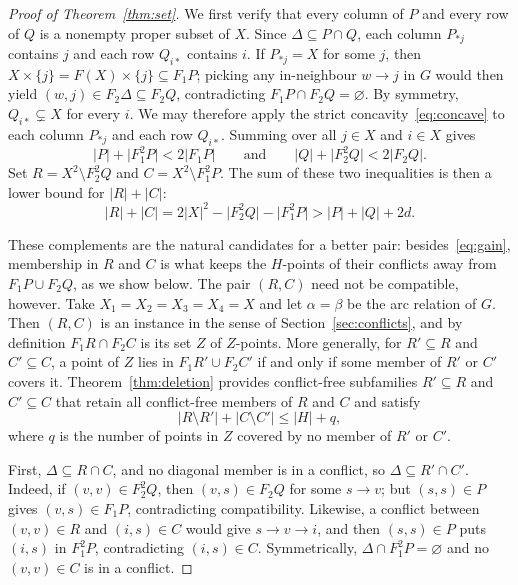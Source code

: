 \documentclass[11pt]{amsart}
\theoremstyle{remark}
\newcommand{\abs}[1]{\lvert #1\rvert}
\begin{document}
\begin{proof}[Proof of Theorem~\ref{thm:set}]
We first verify that every column of $P$ and every row of $Q$ is a nonempty proper subset of $X$. Since $\Delta\subseteq P\cap Q$, each column $P_{\ast j}$ contains $j$ and each row $Q_{i\ast}$ contains $i$. If $P_{\ast j}=X$ for some $j$, then $X\times\{j\}=F(X)\times\{j\}\subseteq F_1P$; picking any in-neighbour $w\to j$ in $G$ would then yield $(w,j)\in F_2\Delta\subseteq F_2Q$, contradicting $F_1P\cap F_2Q=\varnothing$. By symmetry, $Q_{i\ast}\subsetneq X$ for every $i$. We may therefore apply the strict concavity~\eqref{eq:concave} to each column $P_{\ast j}$ and each row $Q_{i\ast}$. Summing over all $j\in X$ and $i\in X$ gives
\[
  \abs P+\abs{F_1^2P}<2\abs{F_1P}\qquad\text{and}\qquad \abs Q+\abs{F_2^2Q}<2\abs{F_2Q}.
\]
Set $R=X^2\setminus F_2^2Q$ and $C=X^2\setminus F_1^2P$. The sum of these two inequalities is then a lower bound for $\abs R+\abs C$:
\begin{equation}\label{eq:gain}
  \abs R+\abs C=2\abs X^2-\abs{F_2^2Q}-\abs{F_1^2P}>\abs P+\abs Q+2d.
\end{equation}

These complements are the natural candidates for a better pair: besides~\eqref{eq:gain}, membership in $R$ and $C$ is what keeps the $H$-points of their conflicts away from $F_1P\cup F_2Q$, as we show below. The pair $(R,C)$ need not be compatible, however. Take $X_1=X_2=X_3=X_4=X$ and let $\alpha=\beta$ be the arc relation of $G$. Then $(R,C)$ is an instance in the sense of Section~\ref{sec:conflicts}, and by definition $F_1R\cap F_2C$ is its set $Z$ of $Z$-points. More generally, for $R'\subseteq R$ and $C'\subseteq C$, a point of $Z$ lies in $F_1R'\cup F_2C'$ if and only if some member of $R'$ or $C'$ covers it. Theorem~\ref{thm:deletion} provides conflict-free subfamilies $R'\subseteq R$ and $C'\subseteq C$ that retain all conflict-free members of $R$ and $C$ and satisfy
\begin{equation}\label{eq:del-applied}
  \abs{R\setminus R'}+\abs{C\setminus C'}\le\abs H+q,
\end{equation}
where $q$ is the number of points in $Z$ covered by no member of $R'$ or $C'$.

First, $\Delta\subseteq R\cap C$, and no diagonal member is in a conflict, so $\Delta\subseteq R'\cap C'$. Indeed, if $(v,v)\in F_2^2Q$, then $(v,s)\in F_2Q$ for some $s\to v$; but $(s,s)\in P$ gives $(v,s)\in F_1P$, contradicting compatibility. Likewise, a conflict between $(v,v)\in R$ and $(i,s)\in C$ would give $s\to v\to i$, and then $(s,s)\in P$ puts $(i,s)$ in $F_1^2P$, contradicting $(i,s)\in C$. Symmetrically, $\Delta\cap F_1^2P=\varnothing$ and no $(v,v)\in C$ is in a conflict.


\end{proof}
\end{document}
